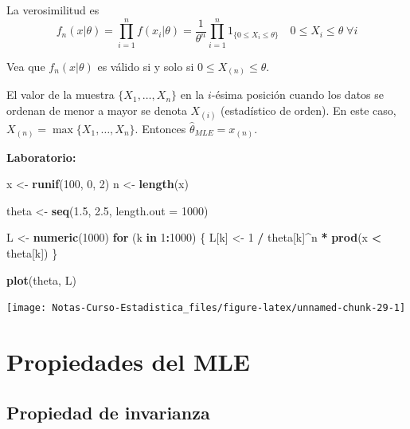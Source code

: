 \documentclass[
  12pt,
]{book}
\newenvironment{Shaded}{\begin{snugshade}}{\end{snugshade}}
\newcommand{\ControlFlowTok}[1]{\textcolor[rgb]{0.13,0.29,0.53}{\textbf{#1}}}
\newcommand{\DataTypeTok}[1]{\textcolor[rgb]{0.13,0.29,0.53}{#1}}
\newcommand{\DecValTok}[1]{\textcolor[rgb]{0.00,0.00,0.81}{#1}}
\newcommand{\FloatTok}[1]{\textcolor[rgb]{0.00,0.00,0.81}{#1}}
\newcommand{\KeywordTok}[1]{\textcolor[rgb]{0.13,0.29,0.53}{\textbf{#1}}}
\newcommand{\NormalTok}[1]{#1}
\newcommand{\OperatorTok}[1]{\textcolor[rgb]{0.81,0.36,0.00}{\textbf{#1}}}
\newcommand{\StringTok}[1]{\textcolor[rgb]{0.31,0.60,0.02}{#1}}
\begin{document}
La verosimilitud es
\[f_n(x|\theta) = \prod_{i=1}^{n} f(x_i|\theta) = \dfrac 1{\theta^n} \prod_{i=1}^n 1_{\{0\leq X_i\leq \theta\}} \quad 0\leq X_i \leq \theta \;\forall i\]

Vea que \(f_n(x|\theta)\) es válido si y solo si \(0\leq X_{(n)}\leq \theta\).

El valor de la muestra \(\{X_1,\dots, X_n\}\) en la \(i\)-ésima posición cuando los
datos se ordenan de menor a mayor se denota \(X_{(i)}\) (estadístico de orden). En
este caso, \(X_{(n)} = \max\{X_1,\dots, X_n\}\). Entonces \(\hat\theta_{MLE} = x_{(n)}\).

\textbf{Laboratorio:}

\begin{Shaded}
\begin{Highlighting}[]
\NormalTok{x \textless{}{-}}\StringTok{ }\KeywordTok{runif}\NormalTok{(}\DecValTok{100}\NormalTok{, }\DecValTok{0}\NormalTok{, }\DecValTok{2}\NormalTok{)}
\NormalTok{n \textless{}{-}}\StringTok{ }\KeywordTok{length}\NormalTok{(x)}

\NormalTok{theta \textless{}{-}}\StringTok{ }\KeywordTok{seq}\NormalTok{(}\FloatTok{1.5}\NormalTok{, }\FloatTok{2.5}\NormalTok{, }\DataTypeTok{length.out =} \DecValTok{1000}\NormalTok{)}

\NormalTok{L \textless{}{-}}\StringTok{ }\KeywordTok{numeric}\NormalTok{(}\DecValTok{1000}\NormalTok{)}
\ControlFlowTok{for}\NormalTok{ (k }\ControlFlowTok{in} \DecValTok{1}\OperatorTok{:}\DecValTok{1000}\NormalTok{) \{}
\NormalTok{  L[k] \textless{}{-}}\StringTok{ }\DecValTok{1} \OperatorTok{/}\StringTok{ }\NormalTok{theta[k]}\OperatorTok{\^{}}\NormalTok{n }\OperatorTok{*}\StringTok{ }\KeywordTok{prod}\NormalTok{(x }\OperatorTok{\textless{}}\StringTok{ }\NormalTok{theta[k])}
\NormalTok{\}}

\KeywordTok{plot}\NormalTok{(theta, L)}
\end{Highlighting}
\end{Shaded}

\begin{center}\texttt{[image: Notas-Curso-Estadistica\_files/figure-latex/unnamed-chunk-29-1]} \end{center}

\hypertarget{propiedades-del-mle}{%
\section{Propiedades del MLE}\label{propiedades-del-mle}}

\hypertarget{propiedad-de-invarianza}{%
\subsection{Propiedad de invarianza}\label{propiedad-de-invarianza}}
\end{document}
